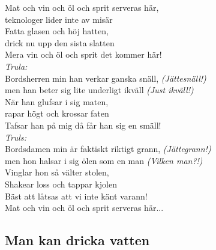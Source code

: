 \noindent Mat och vin och öl och sprit serveras här,\\
\noindent teknologer lider inte av misär\\
\noindent Fatta glasen och höj hatten,\\
\noindent drick nu upp den sista slatten\\
\noindent Mera vin och öl och sprit det kommer här!\\

\noindent \textit{Trula:}\\
\noindent Bordsherren min han verkar ganska snäll, \textit{(Jättesnäll!)}\\
\noindent men han beter sig lite underligt ikväll \textit{(Just ikväll!)}\\
\noindent När han glufsar i sig maten,\\
\noindent rapar högt och krossar faten\\
\noindent Tafsar han på mig då får han sig en smäll!\\

\noindent \textit{Truls:}\\
\noindent Bordsdamen min är faktiskt riktigt grann, \textit{(Jättegrann!)}\\
\noindent men hon halsar i sig ölen som en man \textit{(Vilken man?!)}\\
\noindent Vinglar hon så välter stolen,\\
\noindent Shakear loss och tappar kjolen\\
\noindent Bäst att låtsas att vi inte känt varann!\\

\noindent Mat och vin och öl och sprit serveras här...\\


\newpage

\subsection*{Man kan dricka vatten} 


